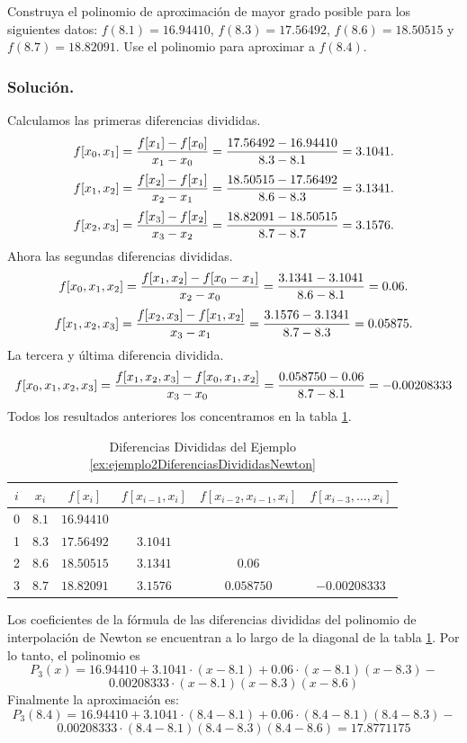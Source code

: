 \begin{example}{\rm Construya el polinomio de aproximación de mayor grado posible para los siguientes datos: $f(8.1)=16.94410$, $f(8.3)=17.56492$,
		$f(8.6)=18.50515$ y $f(8.7)=18.82091$. Use el polinomio para aproximar a $f(8.4)$.\\
	\subsubsection*{Solución.} 
		Calculamos las primeras diferencias divididas.
		$$f[x_0,x_1] = {f[x_1] - f[x_0]\over x_1 - x_0} = {17.56492-16.94410\over 8.3-8.1} = 3.1041.$$
		$$f[x_1,x_2] = {f[x_2] - f[x_1]\over x_2 - x_1} = {18.50515-17.56492\over 8.6-8.3} = 3.1341.$$
		$$f[x_2,x_3] = {f[x_3] - f[x_2]\over x_3 - x_2} = {18.82091-18.50515\over 8.7-8.7} = 3.1576.$$
		Ahora las segundas diferencias divididas.
		$$f[x_0,x_1,x_2] = {f[x_1,x_2] - f[x_0-x_1]\over x_2 - x_0} = {3.1341-3.1041\over 8.6-8.1} = 0.06.$$
		$$f[x_1,x_2,x_3] = {f[x_2,x_3] - f[x_1,x_2]\over x_3 - x_1} = {3.1576-3.1341\over 8.7-8.3} = 0.05875.$$
		La tercera y última diferencia dividida.
		$$f[x_0,x_1,x_2,x_3] = {f[x_1,x_2,x_3]-f[x_0,x_1,x_2]\over x_3-x_0} = {0.058750-0.06\over 8.7-8.1} = -0.00208333$$
	Todos los resultados anteriores los concentramos en la tabla \ref{table:ejemplo2DiferenciasDivididasNewton}.
	\begin{table}[H]
		\centering
      \begin{tabular}{|c|c|c|c|c|c|}
				\hline 
				\rowcolor[gray]{0.9} $i$ & $x_i$ & $f[x_i]$ & $f[x_{i-1}, x_i]$ & $f[x_{i-2},x_{i-1},x_i]$ & $f[x_{i-3},\dots,x_i]$\\ \hline
					0 & $8.1$ & $16.94410$ & & & \\
					1 & $8.3$ & $17.56492$ & $3.1041$ &  & \\
					2 & $8.6$ & $18.50515$ & $3.1341$ & $0.06$ & \\
					3 & $8.7$ & $18.82091$ & $3.1576$ & $0.058750$ & $-0.00208333$ \\
				\hline
      	\end{tabular}
      	\caption{Diferencias Divididas del Ejemplo \ref{ex:ejemplo2DiferenciasDivididasNewton}}
      	\label{table:ejemplo2DiferenciasDivididasNewton}
	\end{table}

	Los coeficientes de la fórmula de las diferencias divididas del polinomio de interpolación de Newton se encuentran a lo largo de la diagonal 
	de la tabla \ref{table:ejemplo2DiferenciasDivididasNewton}. Por lo tanto, el polinomio es
	$$P_3(x) = 16.94410 + 3.1041\cdot(x-8.1) + 0.06\cdot(x-8.1)(x-8.3) - $$
	$$0.00208333\cdot(x-8.1)(x-8.3)(x-8.6)$$	
	Finalmente la aproximación es:
	$$P_3(8.4) = 16.94410 + 3.1041\cdot(8.4-8.1) + 0.06\cdot(8.4-8.1)(8.4-8.3) - $$
	$$0.00208333\cdot(8.4-8.1)(8.4-8.3)(8.4-8.6) = 17.8771175$$
	
	\label{ex:ejemplo2DiferenciasDivididasNewton}
}\end{example}

